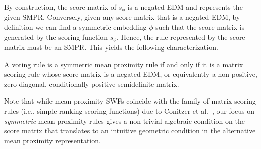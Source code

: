 \documentclass[prodmode]{acmsmall-ec14}
\newcommand{\calL}{{\mathcal{L}}}
\newcommand{\rank}{{\calL(A)}}
\DeclareMathOperator*{\argmax}{arg\,max}
\DeclareMathOperator*{\argmin}{arg\,min}
\begin{document}
By construction, the score matrix of $s_{\phi}$ is a negated EDM and represents the given SMPR.  Conversely, given any score matrix that is a negated EDM, by definition we can find a symmetric embedding $\phi$ such that the score matrix is generated by the scoring function $s_{\phi}$. Hence, the rule represented by the score matrix must be an SMPR. This yields the following characterization. 
%
\begin{theorem}
A voting rule is a symmetric mean proximity rule if and only if it is a matrix scoring rule whose score matrix is a negated EDM, or equivalently a non-positive, zero-diagonal, conditionally positive semidefinite matrix.
\label{thm:symm}
\end{theorem}
%
Note that while mean proximity SWFs coincide with the family of matrix scoring rules (i.e., simple ranking scoring functions) due to Conitzer et al.~, our focus on \emph{symmetric} mean proximity rules gives a non-trivial algebraic condition on the score matrix that translates to an intuitive geometric condition in the alternative mean proximity representation. 
\end{document}

